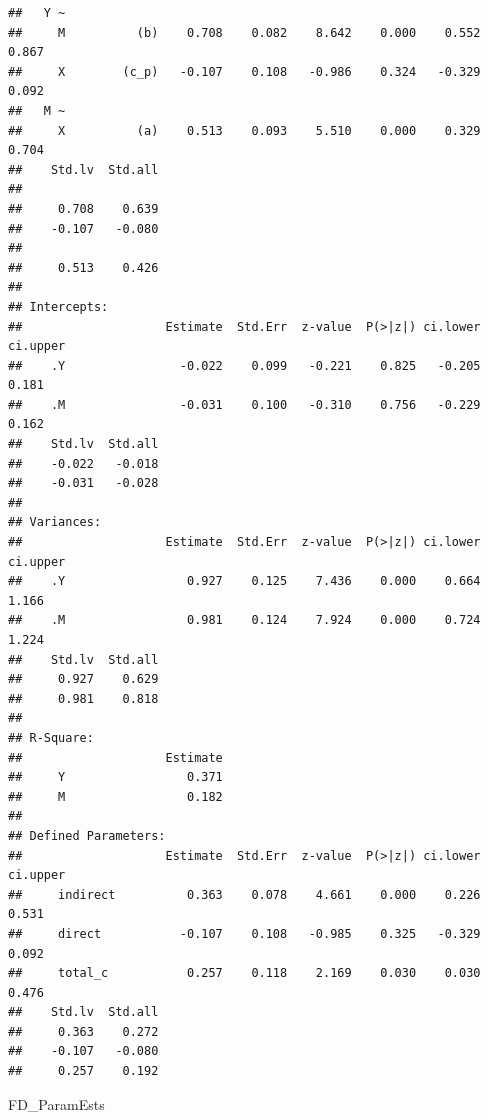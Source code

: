 \documentclass[
  11pt,
]{book}
\newenvironment{Shaded}{\begin{snugshade}}{\end{snugshade}}
\newcommand{\NormalTok}[1]{#1}
\begin{document}
\begin{verbatim}
##   Y ~                                                                   
##     M          (b)    0.708    0.082    8.642    0.000    0.552    0.867
##     X        (c_p)   -0.107    0.108   -0.986    0.324   -0.329    0.092
##   M ~                                                                   
##     X          (a)    0.513    0.093    5.510    0.000    0.329    0.704
##    Std.lv  Std.all
##                   
##     0.708    0.639
##    -0.107   -0.080
##                   
##     0.513    0.426
## 
## Intercepts:
##                    Estimate  Std.Err  z-value  P(>|z|) ci.lower ci.upper
##    .Y                -0.022    0.099   -0.221    0.825   -0.205    0.181
##    .M                -0.031    0.100   -0.310    0.756   -0.229    0.162
##    Std.lv  Std.all
##    -0.022   -0.018
##    -0.031   -0.028
## 
## Variances:
##                    Estimate  Std.Err  z-value  P(>|z|) ci.lower ci.upper
##    .Y                 0.927    0.125    7.436    0.000    0.664    1.166
##    .M                 0.981    0.124    7.924    0.000    0.724    1.224
##    Std.lv  Std.all
##     0.927    0.629
##     0.981    0.818
## 
## R-Square:
##                    Estimate
##     Y                 0.371
##     M                 0.182
## 
## Defined Parameters:
##                    Estimate  Std.Err  z-value  P(>|z|) ci.lower ci.upper
##     indirect          0.363    0.078    4.661    0.000    0.226    0.531
##     direct           -0.107    0.108   -0.985    0.325   -0.329    0.092
##     total_c           0.257    0.118    2.169    0.030    0.030    0.476
##    Std.lv  Std.all
##     0.363    0.272
##    -0.107   -0.080
##     0.257    0.192
\end{verbatim}

\begin{Shaded}
\begin{Highlighting}[]
\NormalTok{FD\_ParamEsts}
\end{Highlighting}
\end{Shaded}
\end{document}
